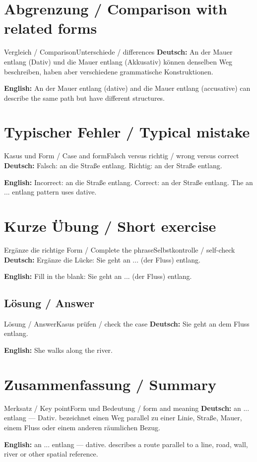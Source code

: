 \documentclass[a4paper,11pt]{article}
\newcommand{\GermanText}[1]{\textbf{Deutsch: }#1\par}
\newcommand{\EnglishText}[1]{{\small\color{SoftGray}\textbf{English: }#1\par}}
\begin{document}
\section{Abgrenzung / Comparison with related forms}
\begin{grammarentry}{Vergleich / Comparison}{Unterschiede / differences}
\GermanText{An der Mauer entlang (Dativ) und die Mauer entlang (Akkusativ) können denselben Weg beschreiben, haben aber verschiedene grammatische Konstruktionen.}
\EnglishText{An der Mauer entlang (dative) and die Mauer entlang (accusative) can describe the same path but have different structures.}
\end{grammarentry}
\section{Typischer Fehler / Typical mistake}
\begin{grammarentry}{Kasus und Form / Case and form}{Falsch versus richtig / wrong versus correct}
\GermanText{Falsch: an die Straße entlang. Richtig: an der Straße entlang.}
\EnglishText{Incorrect: an die Straße entlang. Correct: an der Straße entlang. The an ... entlang pattern uses dative.}
\end{grammarentry}
\section{Kurze Übung / Short exercise}
\begin{grammarentry}{Ergänze die richtige Form / Complete the phrase}{Selbstkontrolle / self-check}
\GermanText{Ergänze die Lücke: Sie geht an ... (der Fluss) entlang.}
\EnglishText{Fill in the blank: Sie geht an ... (der Fluss) entlang.}
\end{grammarentry}
\subsection{Lösung / Answer}
\begin{grammarentry}{Lösung / Answer}{Kasus prüfen / check the case}
\GermanText{Sie geht an dem Fluss entlang.}
\EnglishText{She walks along the river.}
\end{grammarentry}
\section{Zusammenfassung / Summary}
\begin{grammarentry}{Merksatz / Key point}{Form und Bedeutung / form and meaning}
\GermanText{an ... entlang — Dativ. bezeichnet einen Weg parallel zu einer Linie, Straße, Mauer, einem Fluss oder einem anderen räumlichen Bezug.}
\EnglishText{an ... entlang — dative. describes a route parallel to a line, road, wall, river or other spatial reference.}
\end{grammarentry}
\end{document}
